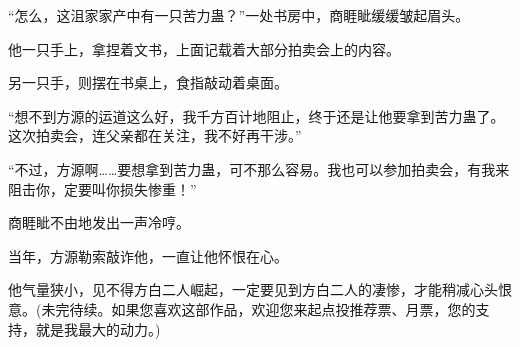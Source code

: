 \begin{this_body}
“怎么，这沮家家产中有一只苦力蛊？”一处书房中，商睚眦缓缓皱起眉头。

他一只手上，拿捏着文书，上面记载着大部分拍卖会上的内容。

另一只手，则摆在书桌上，食指敲动着桌面。

“想不到方源的运道这么好，我千方百计地阻止，终于还是让他要拿到苦力蛊了。这次拍卖会，连父亲都在关注，我不好再干涉。”

“不过，方源啊……要想拿到苦力蛊，可不那么容易。我也可以参加拍卖会，有我来阻击你，定要叫你损失惨重！”

商睚眦不由地发出一声冷哼。

当年，方源勒索敲诈他，一直让他怀恨在心。

他气量狭小，见不得方白二人崛起，一定要见到方白二人的凄惨，才能稍减心头恨意。(未完待续。如果您喜欢这部作品，欢迎您来起点投推荐票、月票，您的支持，就是我最大的动力。)

\end{this_body}

